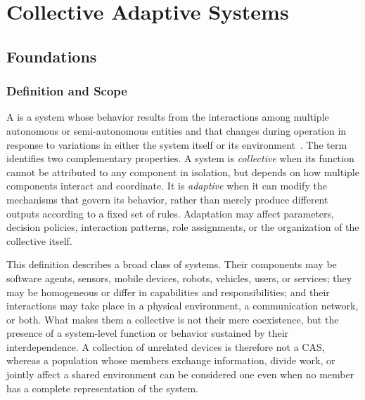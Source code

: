 
\chapter{Collective Adaptive Systems}
\label{chap:context}
\minitoc

\section{Foundations}
\label{sec:cas-foundations}

\subsection{Definition and Scope}
\label{subsec:cas-definition}

A  is a system whose behavior results
 from the interactions among multiple autonomous or semi-autonomous entities 
 and that changes during operation in response to variations in either the system itself 
 or its environment~\cite{DBLP:conf/huc/Ferscha15}. 
% 
The term identifies two complementary properties. 
%
A system is \emph{collective} when its function cannot be attributed to any component in isolation, 
 but depends on how multiple components interact and coordinate. 
% 
It is \emph{adaptive} when it can modify the mechanisms that govern its behavior, 
 rather than merely produce different outputs according to a fixed set of rules. 
% 
Adaptation may affect parameters, decision policies, interaction patterns, role assignments, 
 or the organization of the collective itself.

This definition describes a broad class of systems. 
%
Their components may be software agents, sensors, mobile devices, robots, vehicles, users, or services;
 they may be homogeneous or differ in capabilities and responsibilities; 
 and their interactions may take place in a physical environment, a communication network, or both. 
%
What makes them a collective is not their mere coexistence,
 but the presence of a system-level function or behavior sustained by their interdependence. 
% 
A collection of unrelated devices is therefore not a CAS,
 whereas a population whose members exchange information, divide work, 
 or jointly affect a shared environment can be considered one even when 
 no member has a complete representation of the system.

